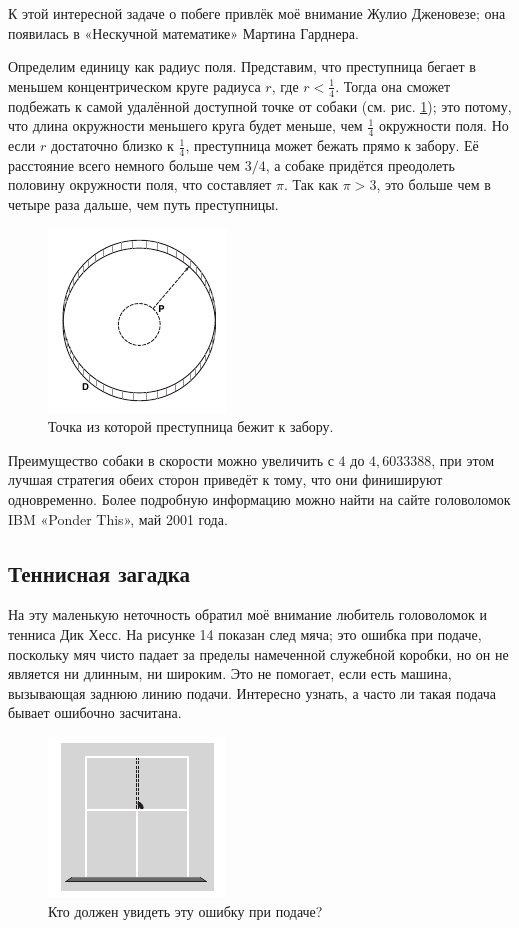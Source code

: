 К этой интересной задаче о побеге привлёк моё внимание Жулио Дженовезе;
она появилась в «Нескучной математике» Мартина Гарднера.

Определим единицу как радиус поля.
Представим, что преступница бегает в меньшем концентрическом круге радиуса $r$, где $r < \tfrac14$.
Тогда она сможет подбежать к самой удалённой доступной точке от собаки (см. рис. \ref{pic:dog});
это потому, что длина окружности меньшего круга будет меньше, чем $\tfrac14$ окружности поля.
Но если $r$ достаточно близко к $\tfrac14$, преступница может бежать прямо к забору.
Её расстояние всего немного больше чем $3/4$, а собаке придётся преодолеть половину окружности поля, что составляет $\pi$.
Так как $\pi > 3$, это больше чем в четыре раза дальше, чем путь преступницы.

\begin{figure}[h!]
\centering
\includegraphics[scale=1]{pics/dog}
\caption{Точка из которой преступница бежит к забору.}
\label{pic:dog}
\end{figure}

Преимущество собаки в скорости можно увеличить с $4$ до $4{,}6033388$, при этом лучшая стратегия обеих сторон приведёт к тому, что они финишируют одновременно.
Более подробную информацию можно найти на сайте головоломок IBM «Ponder This», май 2001 года.

\subsection*{Теннисная загадка}

На эту маленькую неточность обратил моё внимание любитель головоломок и тенниса Дик Хесс.
На рисунке 14 показан след мяча; это ошибка при подаче, поскольку мяч чисто падает за пределы намеченной служебной коробки, но он не является ни длинным, ни широким.
Это не помогает, если есть машина, вызывающая заднюю линию подачи.
Интересно узнать, а часто ли такая подача бывает ошибочно засчитана.

\begin{figure}[h!]
\centering
\includegraphics[scale=1]{pics/tenis}
\caption{Кто должен увидеть эту ошибку при подаче?}
\label{pic:tenis}
\end{figure}

